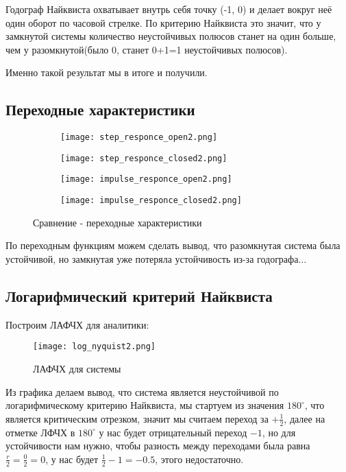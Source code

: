 Годограф Найквиста охватывает внутрь себя точку (-1, 0) и делает вокруг неё один оборот по часовой стрелке. 
По критерию Найквиста это значит, что у замкнутой системы количество неустойчивых полюсов станет на один больше, чем у разомкнутой(было 0, станет 0+1=1 неустойчивых полюсов). 

Именно такой результат мы в итоге и получили.

\newpage
\subsection{Переходные характеристики}

\begin{figure}[hbt!]
  \begin{subfigure}{.500\linewidth}
    \texttt{[image: step\_responce\_open2.png]}
    \caption{}
  \end{subfigure}\hfill %
  \begin{subfigure}{.500\linewidth}
    \texttt{[image: step\_responce\_closed2.png]}
    \caption{}
  \end{subfigure}
  
  \medskip 
  \begin{subfigure}{.500\linewidth}
    \texttt{[image: impulse\_responce\_open2.png]}
    \caption{}
  \end{subfigure}\hfill 
  \begin{subfigure}{.500\linewidth}
    \texttt{[image: impulse\_responce\_closed2.png]}
    \caption{}
  \end{subfigure}
  
  \caption{Сравнение - переходные характеристики}
  \end{figure}
По переходным функциям можем сделать вывод, что разомкнутая система была устойчивой, но замкнутая уже потеряла устойчивость из-за годографа...


\newpage
\subsection{Логарифмический критерий Найквиста}
Построим ЛАФЧХ для аналитики:
\begin{figure}[ht]
    \centering
    \texttt{[image: log\_nyquist2.png]}
    \caption{ЛАФЧХ для системы}
  \end{figure}

Из графика делаем вывод, что система является неустойчивой по логарифмическому критерию Найквиста, 
мы стартуем из значения $180^\circ$, что является критическим отрезком, значит мы считаем переход за $+\frac{1}{2}$, 
далее на отметке ЛФЧХ в $180^\circ$ у нас будет отрицательный переход $-1$, но для устойчивости нам нужно, чтобы разность между переходами была равна $\frac{r}{2}= \frac{0}{2} = 0$, у нас будет $\frac{1}{2} -1 = -0.5$, этого недостаточно.


